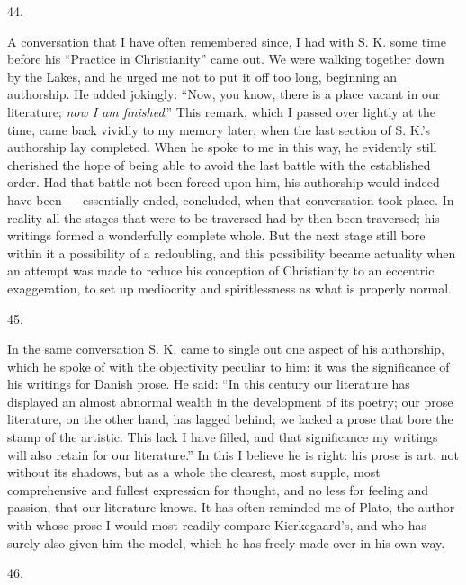 \documentclass[12pt,a4paper,openany]{book}
\newcommand{\secnum}[1]{\par\begin{center}#1\end{center}\par\nobreak}
\newcommand{\opage}[1]{\marginnote{\footnotesize\textit{[#1]}}}
\begin{document}
\secnum{\opage{369}44.}

A conversation that I have often remembered since, I had with S. K. some time
before his ``Practice in Christianity'' came out. We were walking together
down by the Lakes, and he urged me not to put it off too long, beginning an
authorship. He added jokingly: ``Now, you know, there is a place vacant in our
literature; \emph{now I am finished}.'' This remark, which I passed over
lightly at the time, came back vividly to my memory later, when the last
section of S. K.'s authorship lay completed. When he spoke to me in this way,
he evidently still cherished the hope of being able to avoid the last battle
with the established order. Had that battle not been forced upon him, his
authorship would indeed have been --- essentially ended, concluded, when that
conversation took place. In reality all the stages that were to be traversed
had by then been traversed; his writings formed a wonderfully complete whole.
But the next stage still bore within it a possibility of a redoubling, and
this possibility became actuality when an attempt was made to reduce his
conception of Christianity to an eccentric exaggeration, to set up mediocrity
and spiritlessness as what is properly normal.

\secnum{45.}

In the same conversation S. K. came to single out one aspect of his
authorship, which he spoke of with the objectivity peculiar to him: it was
the significance of his writings for Danish prose. He said: ``In this century
our literature has displayed an almost abnormal wealth in the development of
its poetry; our prose literature, on the other hand, has lagged behind; we
lacked a prose that bore the stamp of the artistic. This lack I have filled,
and that significance my writings will also retain for our literature.'' In
this I believe he is right: his prose is art, not without its shadows, but as
a whole the clearest,
\opage{370}most supple, most comprehensive and fullest expression for thought,
and no less for feeling and passion, that our literature knows. It has often
reminded me of Plato, the author with whose prose I would most readily
compare Kierkegaard's, and who has surely also given him the model, which he
has freely made over in his own way.

\secnum{46.}
\end{document}
